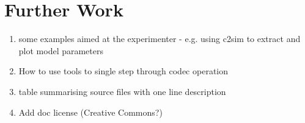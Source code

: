 \documentclass{article}
\begin{document}
\section{Further Work}

\begin{enumerate}
\item some examples aimed at the experimenter - e.g. using c2sim to extract and plot model parameters
\item How to use tools to single step through codec operation
\item table summarising source files with one line description
\item Add doc license (Creative Commons?)
\end{enumerate}




\end{document}
